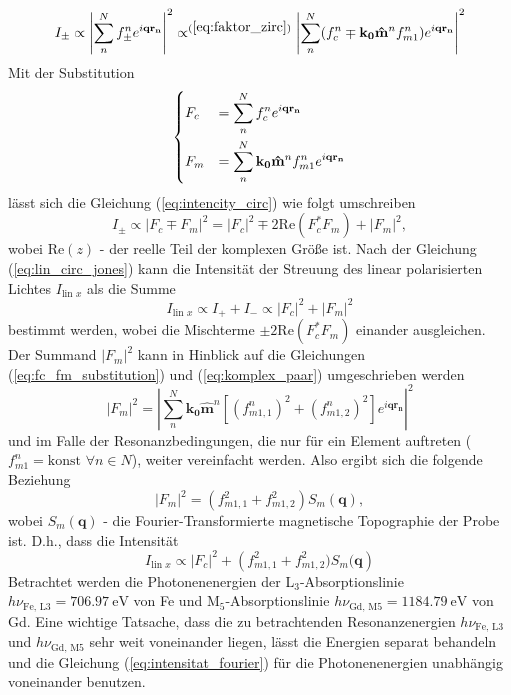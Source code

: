 \begin{equation}
    I_{\pm} \propto \left| \sum_{n}^N f_{\pm}^n e^{i\mathbf{qr_n}} \right|^2 \propto^{(\ref{eq:faktor_zirc})} \left| \sum_{n}^N (f_{c}^n\mp \mathbf{k_0}\mathbf{\hat{m}}^n f_{m1}^n) e^{i\mathbf{qr_n}} \right|^2
    \label{eq:intencity_circ}
\end{equation}
Mit der Substitution
\begin{equation}
    \begin{dcases}
     F_c &= \sum^N_n f_c^n e^{i\mathbf{qr_n}}\\
     F_m &= \sum^N_n \mathbf{k_0}\mathbf{\hat{m}}^n f_{m1}^n e^{i\mathbf{qr_n}}
    \end{dcases}
    \label{eq:fc_fm_substitution}
\end{equation}
lässt sich die Gleichung (\ref{eq:intencity_circ}) wie folgt umschreiben
\begin{equation}
     I_{\pm} \propto \left| F_c \mp F_m \right|^2 = \left| F_c \right|^2 \mp 2\text{Re}(F_c^*F_m) + \left| F_m \right|^2,
\end{equation}
wobei $\text{Re}(z)$ - der reelle Teil der komplexen Größe ist. Nach der Gleichung (\ref{eq:lin_circ_jones}) kann die Intensität der Streuung des linear polarisierten Lichtes $I_{\text{lin $x$}}$ als die Summe
\begin{equation}
    I_{\text{lin $x$}} \propto I_+ + I_- \propto  \left| F_c \right|^2 + \left| F_m \right|^2
\end{equation}
bestimmt werden, wobei die Mischterme $\pm2\text{Re}(F_c^*F_m)$ einander ausgleichen. Der Summand $\left|F_m\right|^2$ kann in Hinblick auf die Gleichungen (\ref{eq:fc_fm_substitution}) und (\ref{eq:komplex_paar}) umgeschrieben werden
\begin{equation}
    \left|F_m\right|^2 =  \left|\sum^N_n \mathbf{k_0}\mathbf{\hat{m}}^n \left[(f_{m1,1}^n)^2 + (f_{m1,2}^n)^2\right] e^{i\mathbf{qr_n}}\right|^2
\end{equation}
und im Falle der Resonanzbedingungen, die nur für ein Element auftreten ($f_{m1}^n = \text{konst } \forall n \in N$), weiter vereinfacht werden. Also ergibt sich die folgende Beziehung
\begin{equation}
   \left|F_m\right|^2 = (f_{m1,1}^2 + f_{m1,2}^2)S_m(\mathbf{q}),
\end{equation}
wobei $S_m(\mathbf{q})$ - die Fourier-Transformierte magnetische Topographie der Probe ist. D.h., dass die Intensität 
\begin{equation}
    I_{\text{lin $x$}} \propto  \left| F_c \right|^2 + \left(f_{m1,1}^2 + f_{m1,2}^2)S_m(\mathbf{q}\right)
    \label{eq:intensitat_fourier}
\end{equation}
Betrachtet werden die Photonenenergien der L$_{3}$-Absorptionslinie $h\nu_{\text{Fe, L3}} = \SI{706.97}{\eV}$ von Fe und M$_{5}$-Absorptionslinie $h\nu_{\text{Gd, M5}} = \SI{1184.79}{\eV}$ von Gd. Eine wichtige Tatsache, dass die zu betrachtenden Resonanzenergien $h\nu_{\text{Fe, L3}}$ und  $h\nu_{\text{Gd, M5}}$ sehr weit voneinander liegen, lässt die Energien separat behandeln und die Gleichung (\ref{eq:intensitat_fourier}) für die Photonenenergien unabhängig voneinander benutzen. 

